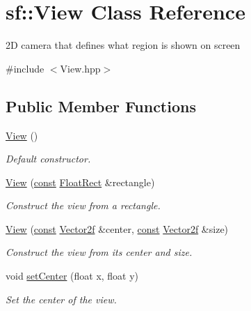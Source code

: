 \hypertarget{classsf_1_1_view}{\section{sf\-:\-:View Class Reference}
\label{classsf_1_1_view}
}


2\-D camera that defines what region is shown on screen  




{\ttfamily \#include $<$View.\-hpp$>$}

\subsection*{Public Member Functions}
\begin{DoxyCompactItemize}
\item 
\hyperlink{classsf_1_1_view_a28c38308ff089ae5bdacd001d12286d3}{View} ()
\begin{DoxyCompactList}\small\item\em Default constructor. \end{DoxyCompactList}\item 
\hyperlink{classsf_1_1_view_a1d63bc49e041b3b1ff992bb6430e1326}{View} (\hyperlink{term__entry_8h_a57bd63ce7f9a353488880e3de6692d5a}{const} \hyperlink{namespacesf_ab0d978f5903922a6bdfca1736b71ccc9}{Float\-Rect} \&rectangle)
\begin{DoxyCompactList}\small\item\em Construct the view from a rectangle. \end{DoxyCompactList}\item 
\hyperlink{classsf_1_1_view_afdaf84cfc910ef160450d63603457ea4}{View} (\hyperlink{term__entry_8h_a57bd63ce7f9a353488880e3de6692d5a}{const} \hyperlink{namespacesf_a80cea3c46537294fd1d8d428566ad8b2}{Vector2f} \&center, \hyperlink{term__entry_8h_a57bd63ce7f9a353488880e3de6692d5a}{const} \hyperlink{namespacesf_a80cea3c46537294fd1d8d428566ad8b2}{Vector2f} \&size)
\begin{DoxyCompactList}\small\item\em Construct the view from its center and size. \end{DoxyCompactList}\item 
void \hyperlink{classsf_1_1_view_aa8e3fedb008306ff9811163545fb75f2}{set\-Center} (float x, float y)
\begin{DoxyCompactList}\small\item\em Set the center of the view. \end{DoxyCompactList}\item 

\end{DoxyCompactItemize}
